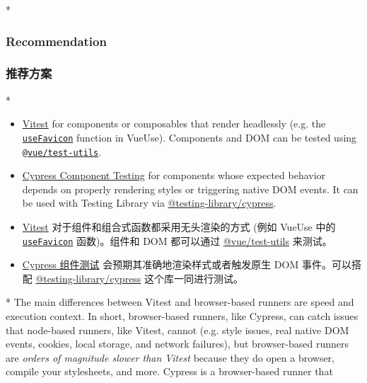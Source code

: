 \begin{paracol}{2}
 
\switchcolumn[0]*%
\subsubsection{Recommendation}
\switchcolumn
\subsubsection{推荐方案}
\switchcolumn[0]*%
\begin{itemize}
\item
  \href{https://vitest.dev/}{Vitest} for components or composables that
  render headlessly (e.g. the
  \href{https://vueuse.org/core/useFavicon/\#usefavicon}{\texttt{useFavicon}}
  function in VueUse). Components and DOM can be tested using
  \href{https://github.com/vuejs/test-utils}{\texttt{@vue/test-utils}}.
\item
  \href{https://on.cypress.io/component}{Cypress Component Testing} for
  components whose expected behavior depends on properly rendering
  styles or triggering native DOM events. It can be used with Testing
  Library via
  \href{https://testing-library.com/docs/cypress-testing-library/intro}{@testing-library/cypress}.
\end{itemize}
\switchcolumn
\begin{itemize}
\item
  \href{https://vitest.dev/}{Vitest}
  对于组件和组合式函数都采用无头渲染的方式 (例如 VueUse 中的
  \href{https://vueuse.org/core/useFavicon/\#usefavicon}{\texttt{useFavicon}}
  函数)。组件和 DOM 都可以通过
  \href{https://github.com/vuejs/test-utils}{@vue/test-utils} 来测试。
\item
  \href{https://on.cypress.io/component}{Cypress 组件测试}
  会预期其准确地渲染样式或者触发原生 DOM 事件。可以搭配
  \href{https://testing-library.com/docs/cypress-testing-library/intro}{@testing-library/cypress}
  这个库一同进行测试。
\end{itemize}
\switchcolumn[0]*%
The main differences between Vitest and browser-based runners are speed
and execution context. In short, browser-based runners, like Cypress,
can catch issues that node-based runners, like Vitest, cannot (e.g.
style issues, real native DOM events, cookies, local storage, and
network failures), but browser-based runners are \emph{orders of
magnitude slower than Vitest} because they do open a browser, compile
your stylesheets, and more. Cypress is a browser-based runner that

\end{paracol}
